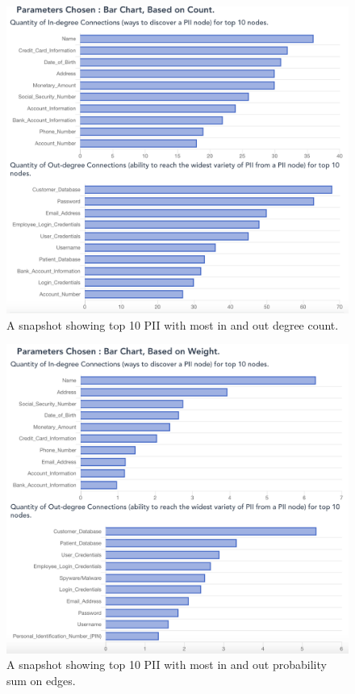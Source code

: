 \documentclass[conference]{IEEEtran}
\begin{document}
\begin{figure}[ht!]
  \includegraphics[width=\linewidth]{barchart_most_count.png}
  \caption{A snapshot showing top 10 PII with most in and out degree count.}
  \label{fig:barchart_most_count}
\end{figure}

\begin{figure}[ht!]
  \includegraphics[width=\linewidth]{barchart_most_weight.png}
  \caption{A snapshot showing top 10 PII with most in and out probability sum on edges.}
  \label{fig:barchart_most_weight}
\end{figure}
\end{document}

